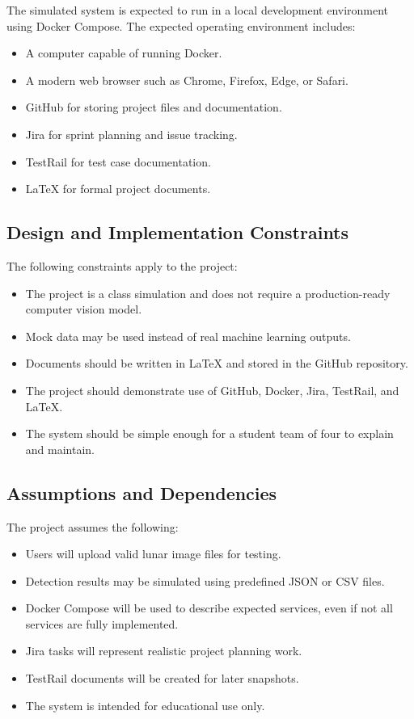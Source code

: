 \documentclass[12pt]{article}
\begin{document}
The simulated system is expected to run in a local development environment using Docker Compose. The expected operating environment includes:

\begin{itemize}
    \item A computer capable of running Docker.
    \item A modern web browser such as Chrome, Firefox, Edge, or Safari.
    \item GitHub for storing project files and documentation.
    \item Jira for sprint planning and issue tracking.
    \item TestRail for test case documentation.
    \item LaTeX for formal project documents.
\end{itemize}

\subsection{Design and Implementation Constraints}

The following constraints apply to the project:

\begin{itemize}
    \item The project is a class simulation and does not require a production-ready computer vision model.
    \item Mock data may be used instead of real machine learning outputs.
    \item Documents should be written in LaTeX and stored in the GitHub repository.
    \item The project should demonstrate use of GitHub, Docker, Jira, TestRail, and LaTeX.
    \item The system should be simple enough for a student team of four to explain and maintain.
\end{itemize}

\subsection{Assumptions and Dependencies}

The project assumes the following:

\begin{itemize}
    \item Users will upload valid lunar image files for testing.
    \item Detection results may be simulated using predefined JSON or CSV files.
    \item Docker Compose will be used to describe expected services, even if not all services are fully implemented.
    \item Jira tasks will represent realistic project planning work.
    \item TestRail documents will be created for later snapshots.
    \item The system is intended for educational use only.
\end{itemize}
\end{document}
